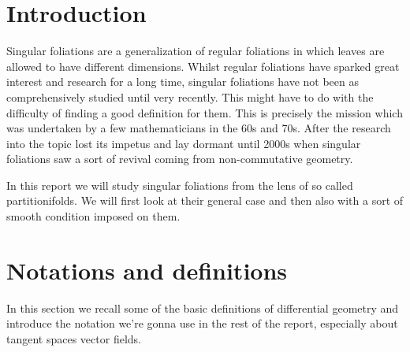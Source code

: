 



\begin{titlepage}
   \begin{center}
       \vspace*{4cm}

       {\LARGE
       \bf
       A Short Introduction into Singular Foliations from the Perspective of Partitionifolds

       \vspace{1cm}

       {\large
       \textbf{Elias Garcia-Naze \& Max Sundblad}

       \vspace{0.5cm}

       July 2025
   \end{center}
\end{titlepage}

\tableofcontents

\newpage

\section{Introduction}
    Singular foliations are a generalization of regular foliations in which leaves are allowed to have different dimensions. Whilst regular foliations have sparked great interest and research for a long time, singular foliations have not been as comprehensively studied until very recently. This might have to do with the difficulty of finding a good definition for them. This is precisely the mission which was undertaken by a few mathematicians in the 60s and 70s. After the research into the topic lost its impetus and lay dormant until 2000s when singular foliations saw a sort of revival coming from non-commutative geometry.

    In this report we will study singular foliations from the lens of so called partitionifolds. We will first look at their general case and then also with a sort of smooth condition imposed on them.

\section{Notations and definitions}
    In this section we recall some of the basic definitions of differential geometry and introduce the notation we're gonna use in the rest of the report, especially about tangent spaces vector fields.

